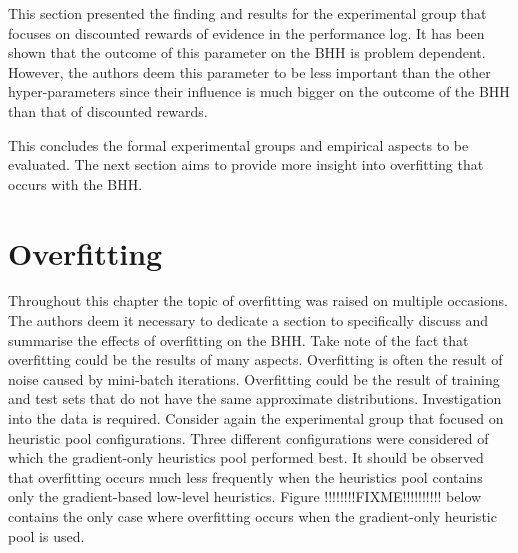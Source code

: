 This section presented the finding and results for the experimental group that focuses on discounted rewards of evidence in the performance log. It has been shown that the outcome of this parameter on the \Ac{BHH} is problem dependent. However, the authors deem this parameter to be less important than the other hyper-parameters since their influence is much bigger on the outcome of the \Ac{BHH} than that of discounted rewards.

This concludes the formal experimental groups and empirical aspects to be evaluated. The next section aims to provide more insight into overfitting that occurs with the \Ac{BHH}.






\section{Overfitting}
\label{sec:results:overfitting}

Throughout this chapter the topic of overfitting was raised on multiple occasions. The authors deem it necessary to dedicate a section to specifically discuss and summarise the effects of overfitting on the \Ac{BHH}. Take note of the fact that overfitting could be the results of many aspects. Overfitting is often the result of noise caused by mini-batch iterations. Overfitting could be the result of training and test sets that do not have the same approximate distributions. Investigation into the data is required. Consider again the experimental group that focused on heuristic pool configurations. Three different configurations were considered of which the gradient-only heuristics pool performed best. It should be observed that overfitting occurs much less frequently when the heuristics pool contains only the gradient-based low-level heuristics. Figure !!!!!!!!FIXME!!!!!!!!!! below contains the only case where overfitting occurs when the gradient-only heuristic pool is used.




